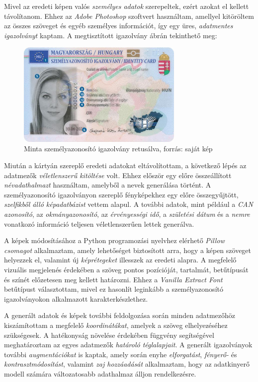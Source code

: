 \documentclass[
]{thesis-ekf}
\theoremstyle{definition}
\theoremstyle{remark}
\begin{document}
Mivel az eredeti képen valós \emph{személyes adatok} szerepeltek, ezért azokat el kellett távolítanom. Ehhez az \emph{Adobe Photoshop} szoftvert használtam, amellyel kitöröltem az összes szöveget és egyéb személyes információt, így egy üres, \emph{adatmentes igazolványt} kaptam. A megtisztított igazolvány  ábrán tekinthető meg:

\FloatBarrier \begin{figure}[H] \centering \includegraphics[width=8cm]{eszemelyi-front_photoshopped} \caption{Minta személyazonosító igazolvány retusálva, forrás: saját kép } \label{fig-eszemelyi-photoshopped} \end{figure}

Miután a kártyán szereplő eredeti adatokat eltávolítottam, a következő lépés az adatmezők \emph{véletlenszerű kitöltése} volt. Ehhez először egy előre összeállított \emph{névadathalmazt} használtam, amelyből a nevek generálása történt. A személyazonosító igazolványon szereplő fényképekhez egy előre összegyűjtött, \emph{szelfikből álló képadatbázist} vettem alapul. A további adatok, mint például a \emph{CAN azonosító}, az \emph{okmányazonosító}, az \emph{érvényességi idő}, a \emph{születési dátum} és a \emph{nemre} vonatkozó információ teljesen véletlenszerűen lettek generálva.\cite{nameDataset, selfieDataset}

A képek módosításához a Python programozási nyelvhez elérhető \emph{Pillow csomagot} alkalmaztam, amely lehetőséget biztosított arra, hogy a képen szöveget helyezzek el, valamint új \emph{képrétegeket} illesszek az eredeti alapra. A megfelelő vizuális megjelenés érdekében a szöveg pontos pozícióját, tartalmát, betűtípusát és színét előzetesen meg kellett határozni. Ehhez a \emph{Vanilla Extract Font} betűtípust választottam, mivel ez hasonlít leginkább a személyazonosító igazolványokon alkalmazott karakterkészlethez.

A generált adatok és képek további feldolgozása során minden adatmezőhöz kiszámítottam a megfelelő \emph{koordinátákat}, amelyek a szöveg elhelyezéséhez szükségesek. A hatékonyság növelése érdekében függvény segítségével meghatároztam az egyes adatmezők \emph{határoló téglalapjait}. A generált igazolványok további \emph{augmentációkat} is kaptak, amely során enyhe \emph{elforgatást}, \emph{fényerő-} és \emph{kontrasztmódosítást}, valamint \emph{zaj hozzáadását} alkalmaztam, hogy az adatkinyerő modell számára változatosabb adathalmaz álljon rendelkezésre.
\end{document}
